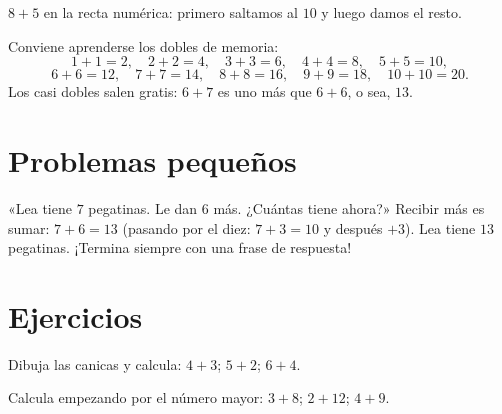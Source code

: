 \begin{omfigure}

{\small $8 + 5$ en la recta numérica: primero saltamos al $10$ y luego damos el resto.}
\end{omfigure}

\begin{example}\label{ex:g1:addition:doubles}
Conviene aprenderse los dobles de memoria:
\[
1+1=2, \quad 2+2=4, \quad 3+3=6, \quad 4+4=8, \quad 5+5=10,
\]
\[
6+6=12, \quad 7+7=14, \quad 8+8=16, \quad 9+9=18, \quad 10+10=20 .
\]
Los casi dobles salen gratis: $6 + 7$ es uno más que $6 + 6$, o sea, $13$.
\end{example}

\section{Problemas pequeños}

\begin{example}\label{ex:g1:addition:problem}
«Lea tiene $7$ pegatinas. Le dan $6$ más. ¿Cuántas tiene ahora?»
Recibir más es sumar: $7 + 6 = 13$ (pasando por el diez:
$7 + 3 = 10$ y después $+3$). Lea tiene $13$ pegatinas. ¡Termina siempre
con una frase de respuesta!
\end{example}

\section{Ejercicios}

\begin{exercise}[$\star$]\label{exo:g1:addition:1}
Dibuja las canicas y calcula: $4 + 3$; \quad $5 + 2$; \quad
$6 + 4$.
\end{exercise}

\begin{exercise}[$\star$]\label{exo:g1:addition:2}
Calcula empezando por el número mayor: $3 + 8$; \quad
$2 + 12$; \quad $4 + 9$.
\end{exercise}

